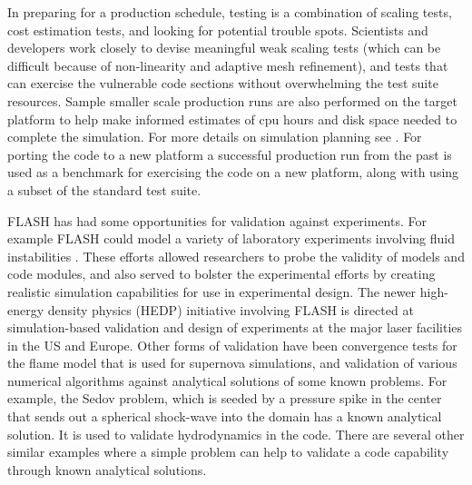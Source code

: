In preparing for a  production schedule, testing is a combination of
scaling tests, cost estimation tests, and looking for potential
trouble spots. Scientists and developers work closely to devise
meaningful weak scaling tests (which can be difficult because of
non-linearity and adaptive mesh refinement), and tests that can 
exercise the vulnerable code sections without overwhelming the test
suite resources. Sample smaller scale production runs are also
performed on the target platform to help make informed estimates of cpu
hours and disk space needed to complete the simulation. For more
details on simulation planning see \cite{Dubey2013}. For porting the
code to 
a new platform a successful production run from the past is used as a
benchmark for exercising the code on a new platform, along with using
a subset of the standard test suite.

FLASH has had some opportunities for validation against
experiments. For example FLASH could model a variety of laboratory
experiments involving fluid instabilities
\cite{Dimonte2004,Kane2001}. These efforts allowed researchers to
probe the validity of models and code modules, and also served to
bolster the experimental efforts by creating realistic simulation
capabilities for use in experimental design. The newer high-energy
density physics (HEDP) initiative involving FLASH  
is directed at simulation-based validation and design of
experiments at the major laser facilities in the US and
Europe. Other forms of validation have been convergence tests for the
flame model that is used for supernova simulations, and validation of
various numerical algorithms against analytical solutions of some
known problems. For example, the Sedov \cite{sedov} problem, which is
seeded by a pressure spike in the center that sends out a spherical
shock-wave into the domain has a known analytical solution. It is used
to validate hydrodynamics in the code. There are several other similar
examples where a simple problem can help to validate a code capability
through known analytical solutions. 

